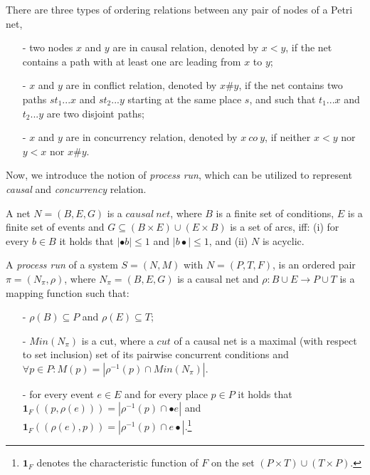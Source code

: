 \documentclass{llncs}
\begin{document}
\begin{definition}\label{def:orderingRelations}
There are three types of ordering relations between any pair of nodes of a Petri net,
	\begin{itemize}
		\item[-] two nodes $x$ and $y$ are in causal relation, denoted by $x<y$, if the net contains a path with at least one arc leading from $x$ to $y$;
		\item[-] $x$ and $y$ are in conflict relation, denoted by $x\#y$, if the net contains two paths $st_{1}...x$ and $st_{2}...y$ starting at the same place $s$, and such that $t_{1}...x$ and $t_{2}...y$ are two disjoint paths;
		\item[-] $x$ and $y$ are in concurrency relation, denoted by $x~co~y$, if neither $x<y$ nor $y<x$ nor $x\#y$.
	\end{itemize}
\end{definition}

Now, we introduce the notion of \textit{process run}, which can be utilized to represent \textit{causal} and \textit{concurrency} relation.

\begin{definition}\label{def:causalNet}
A net $N=(B,E,G)$ is a $causal~net$, where $B$ is a finite set of conditions, $E$ is a finite set of events and $G\subseteq(B\times E)\cup(E\times B)$ is a set of arcs, iff: (i) for every $b\in B$ it holds that $|\bullet b|\leq 1$ and $|b\bullet|\leq 1$, and (ii) $N$ is acyclic.
\end{definition}

\begin{definition}\label{def:run}
A \textit{process run} of a system $S=(N,M)$ with $N=(P,T,F)$, is an ordered pair $\pi=(N_{\pi},\rho)$, where $N_{\pi}=(B,E,G)$ is a causal net and $\rho:B\cup E\rightarrow P\cup T$ is a mapping function such that:
	\begin{itemize}
		\item[-] $\rho(B)\subseteq P$ and $\rho(E)\subseteq T$;
		\item[-] $Min(N_{\pi})$ is a cut, where a $cut$ of a causal net is a maximal (with respect to set inclusion) set of its pairwise concurrent conditions and $\forall p\in P:M(p)=|\rho^{-1}(p)\cap Min(N_{\pi})|$.
		\item[-] for every event $e\in E$ and for every place $p\in P$ it holds that $\bm{1}_{F}((p,\rho(e)))=|\rho^{-1}(p)\cap\bullet e|$ and $\bm{1}_{F}((\rho(e),p))=|\rho^{-1}(p)\cap e\bullet|$.\footnote{$\bm{1}_{F}$ denotes the characteristic function of $F$ on the set $(P\times T)\cup(T\times P)$.}
	\end{itemize}
\end{definition}
\end{document}
